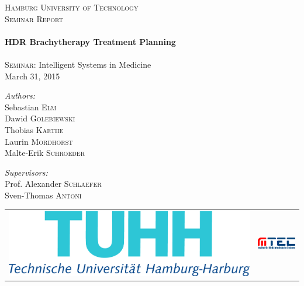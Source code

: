 \begin{titlepage}
\begin{center}
\textsc{\LARGE Hamburg University of Technology}\\
[2.5cm]

\textsc{\LARGE Seminar Report}\\
[0.3cm]

\HRule \\[0.35cm]
{
\huge \bfseries HDR Brachytherapy Treatment Planning \\[0.35cm]
}
\HRule \\[0.7cm]

{\large \textsc{Seminar:} Intelligent Systems in Medicine}\\[0.2cm]

{\large March 31, 2015}\\[3.5cm]

\noindent
\begin{minipage}[t]{0.49\textwidth}
\begin{flushleft}
\emph{Authors:}\\
Sebastian \textsc{Elm} \\
Dawid \textsc{Golebiewski} \\
Thobias \textsc{Karthe} \\
Laurin \textsc{Mordhorst} \\
Malte-Erik \textsc{Schroeder} 
\end{flushleft}
\end{minipage}
\begin{minipage}[t]{0.49\textwidth}
\begin{flushright}
\emph{Supervisors:}\\
Prof. Alexander \textsc{Schlaefer} \\
Sven-Thomas \textsc{Antoni}
\end{flushright}
\end{minipage}
\end{center}

\vfill
\begin{tabular}{l r}
\includegraphics[width=.43\textwidth]{pictures/logo_tuhh.png} & \includegraphics[width=.37\textwidth]{pictures/logo_mtec.png}
\end{tabular}
\end{titlepage}